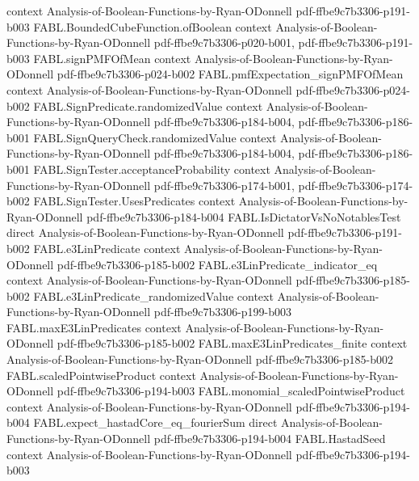 \begin{theorem}
  {context}
  {Analysis-of-Boolean-Functions-by-Ryan-ODonnell}
  {pdf-ffbe9c7b3306-p191-b003}
\proofstep
  {FABL.BoundedCubeFunction.ofBoolean}
  {context}
  {Analysis-of-Boolean-Functions-by-Ryan-ODonnell}
  {pdf-ffbe9c7b3306-p020-b001,
    pdf-ffbe9c7b3306-p191-b003}
\proofstep
  {FABL.signPMFOfMean}
  {context}
  {Analysis-of-Boolean-Functions-by-Ryan-ODonnell}
  {pdf-ffbe9c7b3306-p024-b002}
\proofstep
  {FABL.pmfExpectation_signPMFOfMean}
  {context}
  {Analysis-of-Boolean-Functions-by-Ryan-ODonnell}
  {pdf-ffbe9c7b3306-p024-b002}
\proofstep
  {FABL.SignPredicate.randomizedValue}
  {context}
  {Analysis-of-Boolean-Functions-by-Ryan-ODonnell}
  {pdf-ffbe9c7b3306-p184-b004,
    pdf-ffbe9c7b3306-p186-b001}
\proofstep
  {FABL.SignQueryCheck.randomizedValue}
  {context}
  {Analysis-of-Boolean-Functions-by-Ryan-ODonnell}
  {pdf-ffbe9c7b3306-p184-b004,
    pdf-ffbe9c7b3306-p186-b001}
\proofstep
  {FABL.SignTester.acceptanceProbability}
  {context}
  {Analysis-of-Boolean-Functions-by-Ryan-ODonnell}
  {pdf-ffbe9c7b3306-p174-b001,
    pdf-ffbe9c7b3306-p174-b002}
\proofstep
  {FABL.SignTester.UsesPredicates}
  {context}
  {Analysis-of-Boolean-Functions-by-Ryan-ODonnell}
  {pdf-ffbe9c7b3306-p184-b004}
\proofstep
  {FABL.IsDictatorVsNoNotablesTest}
  {direct}
  {Analysis-of-Boolean-Functions-by-Ryan-ODonnell}
  {pdf-ffbe9c7b3306-p191-b002}
\proofstep
  {FABL.e3LinPredicate}
  {context}
  {Analysis-of-Boolean-Functions-by-Ryan-ODonnell}
  {pdf-ffbe9c7b3306-p185-b002}
\proofstep
  {FABL.e3LinPredicate_indicator_eq}
  {context}
  {Analysis-of-Boolean-Functions-by-Ryan-ODonnell}
  {pdf-ffbe9c7b3306-p185-b002}
\proofstep
  {FABL.e3LinPredicate_randomizedValue}
  {context}
  {Analysis-of-Boolean-Functions-by-Ryan-ODonnell}
  {pdf-ffbe9c7b3306-p199-b003}
\proofstep
  {FABL.maxE3LinPredicates}
  {context}
  {Analysis-of-Boolean-Functions-by-Ryan-ODonnell}
  {pdf-ffbe9c7b3306-p185-b002}
\proofstep
  {FABL.maxE3LinPredicates_finite}
  {context}
  {Analysis-of-Boolean-Functions-by-Ryan-ODonnell}
  {pdf-ffbe9c7b3306-p185-b002}
\proofstep
  {FABL.scaledPointwiseProduct}
  {context}
  {Analysis-of-Boolean-Functions-by-Ryan-ODonnell}
  {pdf-ffbe9c7b3306-p194-b003}
\proofstep
  {FABL.monomial_scaledPointwiseProduct}
  {context}
  {Analysis-of-Boolean-Functions-by-Ryan-ODonnell}
  {pdf-ffbe9c7b3306-p194-b004}
\proofstep
  {FABL.expect_hastadCore_eq_fourierSum}
  {direct}
  {Analysis-of-Boolean-Functions-by-Ryan-ODonnell}
  {pdf-ffbe9c7b3306-p194-b004}
\proofstep
  {FABL.HastadSeed}
  {context}
  {Analysis-of-Boolean-Functions-by-Ryan-ODonnell}
  {pdf-ffbe9c7b3306-p194-b003}
\proofstep

\end{theorem}
